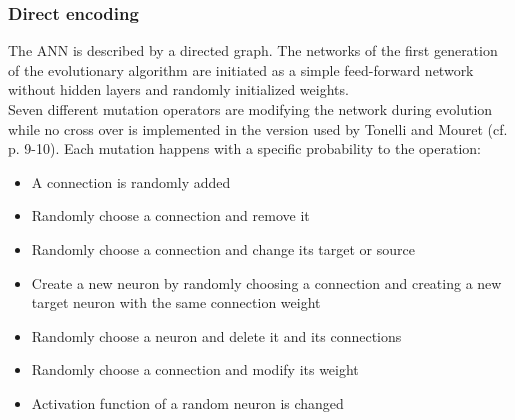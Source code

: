 \documentclass[12pt,twoside]{article}
\theoremstyle{plain}
\theoremstyle{definition}
\theoremstyle{remark}
\begin{document}
\subsubsection{Direct encoding}
The ANN is described by a directed graph. The networks of the first generation of the evolutionary algorithm are initiated as a simple feed-forward network without hidden layers and randomly initialized weights.\\
Seven different mutation operators are modifying the network during evolution while no cross over is implemented in the version used by Tonelli and Mouret (cf. \cite{citeulike:12788284} p. 9-10).
Each mutation happens with a specific probability to the operation:
\begin{itemize}
	\item A connection is randomly added
	\item Randomly choose a connection and remove it
	\item Randomly choose a connection and change its target or source
	\item Create a new neuron by randomly choosing a connection and creating a new target neuron with the same connection weight
	\item Randomly choose a neuron and delete it and its connections
	\item Randomly choose a connection and modify its weight
	\item Activation function of a random neuron is changed
\end{itemize}
\end{document}
